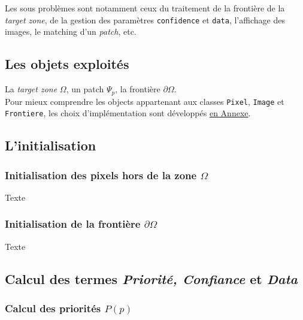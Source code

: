 \documentclass[12pt]{article}
\begin{document}
Les sous problèmes sont notamment ceux du traitement de la frontière 
de la \textit{target zone}, de la gestion des paramètres \texttt{confidence} 
et \texttt{data}, l'affichage des images, le matching d'un \textit{patch}, etc.

\subsection{Les objets exploités}

La \textit{target zone} $\Omega$, un patch $\Psi_p$, la frontière $\partial\Omega$. \\[0.3cm]

Pour mieux comprendre les objects appartenant aux classes \texttt{Pixel}, 
\texttt{Image} et \texttt{Frontiere}, les choix d'implémentation 
sont développés \hyperref[les-classes]{en Annexe}.

\subsection{L'initialisation}

\subsubsection{Initialisation des pixels hors de la zone $\Omega$}

Texte


\subsubsection{Initialisation de la frontière $\partial\Omega$}

Texte



\subsection{Calcul des termes \textit{Priorité, Confiance} et \textit{Data}}

\subsubsection{Calcul des priorités $P(p)$}
\end{document}
